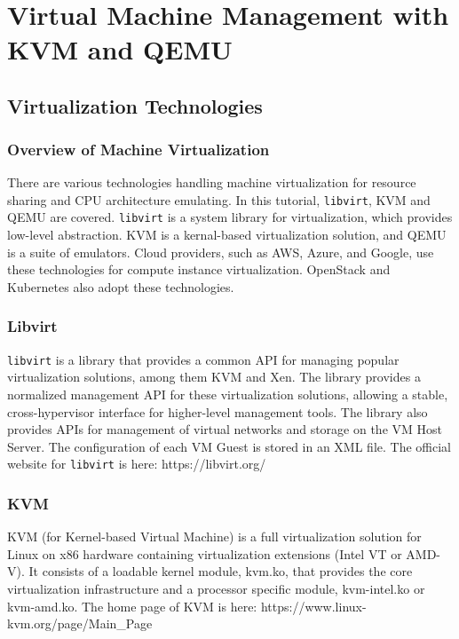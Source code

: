 \MDNAME\

\section{Virtual Machine Management with KVM and QEMU}

\subsection{Virtualization Technologies}

\subsubsection{Overview of Machine Virtualization}

There are various technologies handling machine virtualization for
resource sharing and CPU architecture emulating. In this tutorial,
\texttt{libvirt}, KVM and QEMU are covered. \texttt{libvirt} is a system
library for virtualization, which provides low-level abstraction. KVM is
a kernal-based virtualization solution, and QEMU is a suite of
emulators. Cloud providers, such as AWS, Azure, and Google, use these
technologies for compute instance virtualization. OpenStack and
Kubernetes also adopt these technologies.

\subsubsection{Libvirt}

\texttt{libvirt} is a library that provides a common API for managing
popular virtualization solutions, among them KVM and Xen. The library
provides a normalized management API for these virtualization solutions,
allowing a stable, cross-hypervisor interface for higher-level
management tools. The library also provides APIs for management of
virtual networks and storage on the VM Host Server. The configuration of
each VM Guest is stored in an XML file. The official website for
\texttt{libvirt} is here: https://libvirt.org/

\subsubsection{KVM}

KVM (for Kernel-based Virtual Machine) is a full virtualization solution
for Linux on x86 hardware containing virtualization extensions (Intel VT
or AMD-V). It consists of a loadable kernel module, kvm.ko, that
provides the core virtualization infrastructure and a processor specific
module, kvm-intel.ko or kvm-amd.ko. The home page of KVM is here:
https://www.linux-kvm.org/page/Main\_Page

